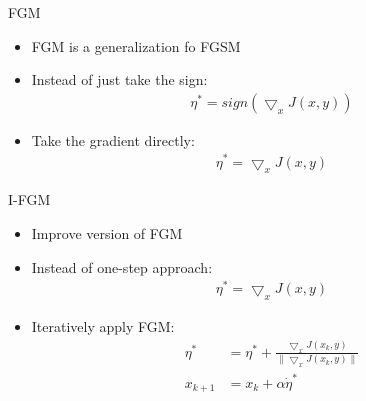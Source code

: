 \documentclass[
 size=12pt,
 paper=smartboard, %
 mode=present, %
 display=slides, %
style=tuliplab,
pauseslide,
fleqn,leqno]{powerdot}
\begin{document}
\begin{slide}{FGM}
  \begin{itemize}
    \item FGM is a generalization fo FGSM
    \item Instead of just take the sign:
      \begin{equation}
        \begin{split}
          \eta^* = sign(\bigtriangledown_xJ(x, y))
        \end{split}
      \end{equation} \pause
    \item Take the gradient directly:
    \begin{equation}
      \begin{split}
        \eta^* = \bigtriangledown_xJ(x, y)
      \end{split}
    \end{equation}
  \end{itemize}
\end{slide}

\begin{slide}{I-FGM}
  \begin{itemize}
    \item Improve version of FGM \pause
    \item Instead of one-step approach:
    \begin{equation}
      \begin{split}
        \eta^* = \bigtriangledown_xJ(x, y)
      \end{split}
    \end{equation}
    \item Iteratively apply FGM:
    \begin{equation}
      \begin{split}
        \eta^* &= \eta^* + \frac{\bigtriangledown_xJ(x_{k}, y)}{\|\bigtriangledown_xJ(x_{k}, y)\|} \\
        x_{k+1} &= x_{k} + \alpha \dot \eta^*
      \end{split}
    \end{equation}
  \end{itemize}
\end{slide}
\end{document}
